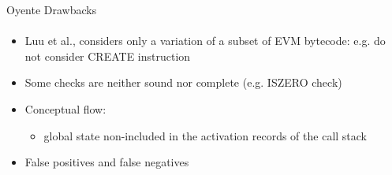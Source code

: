 \begin{frame}{Oyente Drawbacks}
\framesubtitle{\cite{grishchenko2018semantic,bib:securify}}
\begin{itemize}
\item Luu et al., considers only a variation of a subset of EVM bytecode: e.g. do not consider CREATE instruction
\item Some checks are neither sound nor complete (e.g. ISZERO check)
\item Conceptual flow: 
\begin{itemize}
\item global state non-included in the activation records of the call stack
\end{itemize}
\item False positives and false negatives
\end{itemize}

\end{frame}
